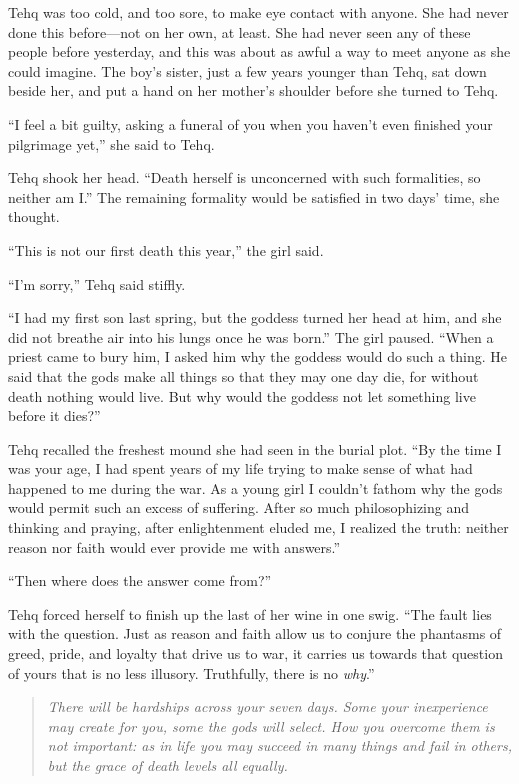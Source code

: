 Tehq was too cold, and too sore, to make eye contact with anyone. She had never done this before---not on her own, at least. She had never seen any of these people before yesterday, and this was about as awful a way to meet anyone as she could imagine. The boy's sister, just a few years younger than Tehq, sat down beside her, and put a hand on her mother's shoulder before she turned to Tehq.

``I feel a bit guilty, asking a funeral of you when you haven't even finished your pilgrimage yet,'' she said to Tehq.

Tehq shook her head. ``Death herself is unconcerned with such formalities, so neither am I.'' The remaining formality would be satisfied in two days' time, she thought.

``This is not our first death this year,'' the girl said.

``I'm sorry,'' Tehq said stiffly.

``I had my first son last spring, but the goddess turned her head at him, and she did not breathe air into his lungs once he was born.'' The girl paused. ``When a priest came to bury him, I asked him why the goddess would do such a thing. He said that the gods make all things so that they may one day die, for without death nothing would live. But why would the goddess not let something live before it dies?''

Tehq recalled the freshest mound she had seen in the burial plot. ``By the time I was your age, I had spent years of my life trying to make sense of what had happened to me during the war. As a young girl I couldn't fathom why the gods would permit such an excess of suffering. After so much philosophizing and thinking and praying, after enlightenment eluded me, I realized the truth: neither reason nor faith would ever provide me with answers.''

``Then where does the answer come from?''

Tehq forced herself to finish up the last of her wine in one swig. ``The fault lies with the question. Just as reason and faith allow us to conjure the phantasms of greed, pride, and loyalty that drive us to war, it carries us towards that question of yours that is no less illusory. Truthfully, there is no \emph{why}.''

\begin{quote}
\emph{There will be hardships across your seven days. Some your inexperience may create for you, some the gods will select. How you overcome them is not important: as in life you may succeed in many things and fail in others, but the grace of death levels all equally.}
\end{quote}


